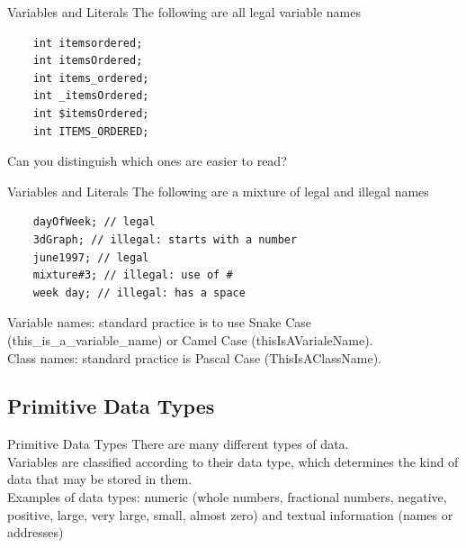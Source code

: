 \documentclass[11pt]{beamer}
\begin{document}
\begin{frame}[fragile]{Variables and Literals}
    The following are all legal variable names
    \begin{lstlisting}
    int itemsordered;
    int itemsOrdered;
    int items_ordered;
    int _itemsOrdered;
    int $itemsOrdered;
    int ITEMS_ORDERED;
    \end{lstlisting}
    Can you distinguish which ones are easier to read?
\end{frame}

\begin{frame}[fragile]{Variables and Literals}
    The following are a mixture of legal and illegal names
    \begin{lstlisting}
    dayOfWeek; // legal
    3dGraph; // illegal: starts with a number
    june1997; // legal
    mixture#3; // illegal: use of #
    week day; // illegal: has a space
    \end{lstlisting}
    Variable names: standard practice is to use Snake Case (this\_is\_a\_variable\_name) or Camel Case (thisIsAVarialeName). \\ \vspace{1em}
    Class names: standard practice is Pascal Case (ThisIsAClassName).
\end{frame}

\subsection{Primitive Data Types}
\begin{frame}[fragile]{Primitive Data Types}
    There are many different types of data. \\ \vspace{1em}
    Variables are classified according to their data type, which determines the kind of data that may be stored in them. \\ \vspace{1em}
    Examples of data types: numeric (whole numbers, fractional numbers, negative, positive, large, very large, small, almost zero) and textual information (names or addresses)
\end{frame}
\end{document}
